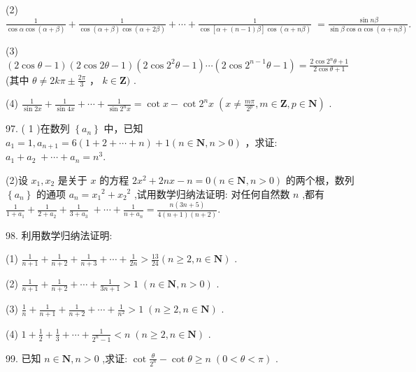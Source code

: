 \documentclass[10pt]{article}
\begin{document}
(2) \(\frac{1}{\cos \alpha \cos \left( {\alpha  + \beta }\right) } + \frac{1}{\cos \left( {\alpha  + \beta }\right) \cos \left( {\alpha  + {2\beta }}\right) } + \cdots  + \frac{1}{\cos \left\lbrack  {\alpha  + \left( {n - 1}\right) \beta }\right\rbrack  \cos \left( {\alpha  + {n\beta }}\right) } \; = \frac{\sin {n\beta }}{\sin \beta \cos \alpha \cos \left( {\alpha  + {n\beta }}\right) }.\)

(3) \(\left( {2\cos \theta  - 1}\right) \left( {2\cos {2\theta } - 1}\right) \left( {2\cos {2}^{2}\theta  - 1}\right) \cdots \left( {2\cos {2}^{n - 1}\theta  - 1}\right)  = \frac{2\cos {2}^{n}\theta  + 1}{2\cos \theta  + 1}\) (其中 \(\theta  \neq  {2k\pi } \pm  \frac{2\pi }{3}\) ， \(k \in  \mathbf{Z})\) .

(4) \(\frac{1}{\sin {2x}} + \frac{1}{\sin {4x}} + \cdots  + \frac{1}{\sin {2}^{n}x} = \cot x - \cot {2}^{n}x\;\left( {x \neq  \frac{m\pi }{{2}^{p}},m \in  \mathbf{Z},p \in  \mathbf{N}}\right)\) .

97. ( 1 )在数列 \(\left\{  {a}_{n}\right\}\) 中，已知 \({a}_{1} = 1,{a}_{n + 1} = 6\left( {1 + 2 + \cdots  + n}\right)  + 1\left( {n \in  \mathbf{N},n > 0}\right)\) ，求证: \({a}_{1} + {a}_{2} \; + \cdots  + {a}_{n} = {n}^{3}.\)

(2)设 \({x}_{1},{x}_{2}\) 是关于 \(x\) 的方程 \(2{x}^{2} + {2nx} - n = 0\left( {n \in  \mathbf{N},n > 0}\right)\) 的两个根，数列 \(\left\{  {a}_{n}\right\}\) 的通项 \({a}_{n} = {x}_{1}{}^{2} + {x}_{2}{}^{2}\) ,试用数学归纳法证明: 对任何自然数 \(n\) ,都有 \(\frac{1}{1 + {a}_{1}} + \frac{1}{2 + {a}_{2}} + \frac{1}{3 + {a}_{3}} \; + \cdots  + \frac{1}{n + {a}_{n}} = \frac{n\left( {{3n} + 5}\right) }{4\left( {n + 1}\right) \left( {n + 2}\right) }.\)

98. 利用数学归纳法证明:

(1) \(\frac{1}{n + 1} + \frac{1}{n + 2} + \frac{1}{n + 3} + \cdots  + \frac{1}{2n} > \frac{13}{24}\left( {n \geq  2,n \in  \mathbf{N}}\right)\) .

(2) \(\frac{1}{n + 1} + \frac{1}{n + 2} + \cdots  + \frac{1}{{3n} + 1} > 1\;\left( {n \in  \mathbf{N},n > 0}\right)\) .

(3) \(\frac{1}{n} + \frac{1}{n + 1} + \frac{1}{n + 2} + \cdots  + \frac{1}{{n}^{2}} > 1\;\left( {n \geq  2,n \in  \mathbf{N}}\right)\) .

(4) \(1 + \frac{1}{2} + \frac{1}{3} + \cdots  + \frac{1}{{2}^{n} - 1} < n\;\left( {n \geq  2,n \in  \mathbf{N}}\right)\) .

99. 已知 \(n \in  \mathbf{N},n > 0\) ,求证: \(\cot \frac{\theta }{{2}^{n}} - \cot \theta  \geq  n\;\left( {0 < \theta  < \pi }\right)\) .
\end{document}
